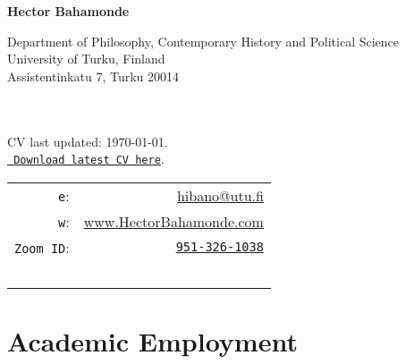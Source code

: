 \documentclass[letterpaper]{article}
\def\name{Hector Bahamonde}
\begin{document}
\centerline{\huge \bf \name}

\vspace{0.25in}

\begin{minipage}{0.45\linewidth}
 Department of Philosophy, Contemporary History and Political Science\\
 University of Turku, Finland\\
 Assistentinkatu 7, Turku 20014\\
  \\
  \\
\begin{footnotesize}
CV last updated: \today. \\
\href{http://github.com/hbahamonde/Job_Market/raw/master/Bahamonde_CV.pdf}{\texttt{{\color{red} Download latest CV here}}}.%
\end{footnotesize}

\end{minipage}
 \hspace{\fill}\begin{minipage}{0.35\linewidth}
  \begin{tabular}{rr}
    \texttt{e}: & \href{mailto:hibano@utu.fi}{hibano@utu.fi} \\
    \texttt{w}: & \href{http://www.hectorbahamonde.com}{www.HectorBahamonde.com}\\
    \texttt{Zoom ID}: & \href{https://us02web.zoom.us/j/9513261038?pwd=S3BSWXQxZW11NC9CRjRoMmd0TkpEZz09}{\texttt{951-326-1038}}\\
    \\
    \\
    \\
    \\
    \\
  \end{tabular}
\end{minipage}


{\unskip}


\section*{Academic Employment}
\end{document}
